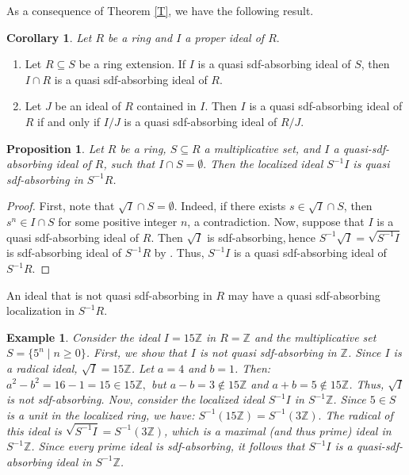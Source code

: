 \documentclass{amsart}%
\newtheorem{example}{Example}[section]
\newtheorem{corollary}{Corollary}[section]
\newtheorem{proposition}{Proposition}[section]
\begin{document}
As a consequence of Theorem \ref{T}, we have the following result.

\begin{corollary}
Let $R$ be a ring and $I$ a proper ideal of $R.$
\end{corollary}

\begin{enumerate}
\item Let $R\subseteq S$ be a ring extension. If $I$ is a quasi sdf-absorbing
ideal of $S$, then $I\cap R$ is a quasi sdf-absorbing ideal of $R$.

\item Let $J$ be an ideal of $R$ contained in $I.$ Then $I$ is a quasi
sdf-absorbing ideal of $R$ if and only if $I/J$ is a quasi sdf-absorbing ideal
of $R/J$.
\end{enumerate}

\begin{proposition}
Let $R$ be a ring, $S\subseteq R$ a multiplicative set, and $I$ a
quasi-sdf-absorbing ideal of $R$, such that $I\cap S=\emptyset.$ Then the
localized ideal $S^{-1}I$ is quasi sdf-absorbing in $S^{-1}R$.
\end{proposition}

\begin{proof}
First, note that $\sqrt{I}\cap S=\emptyset$. Indeed, if there exists
$s\in\sqrt{I}\cap S$, then $s^{n}\in I\cap S$ for some positive integer $n$, a
contradiction. Now, suppose that $I$ is a quasi sdf-absorbing ideal of $R.$
Then $\sqrt{I}$ is sdf-absorbing,$\ $hence $S^{-1}\sqrt{I}=\sqrt{S^{-1}I}$ is
sdf-absorbing ideal of $S^{-1}R$ by \cite[Theorem 2.9]{AB2024}. Thus,
$S^{-1}I$ is a quasi sdf-absorbing ideal of $S^{-1}R$.
\end{proof}

An ideal that is not quasi sdf-absorbing in $R$ may have a quasi sdf-absorbing
localization in $S^{-1}R$.

\begin{example}
Consider the ideal $I=15\mathbb{Z}$ in $R=\mathbb{Z}$ and the multiplicative
set $S=\{5^{n}\mid n\geq0\}$. First, we show that $I$ is not quasi
sdf-absorbing in $\mathbb{Z}$. Since $I$ is a radical ideal, $\sqrt
{I}=15\mathbb{Z}$. Let $a=4$ and $b=1$. Then: $a^{2}-b^{2}=16-1=15\in
15\mathbb{Z},$ but $a-b=3\notin15\mathbb{Z}$ and $a+b=5\notin15\mathbb{Z}$.
Thus, $\sqrt{I}$ is not sdf-absorbing. Now, consider the localized ideal
$S^{-1}I$ in $S^{-1}\mathbb{Z}$. Since $5\in S$ is a unit in the localized
ring, we have: $S^{-1}(15\mathbb{Z})=S^{-1}(3\mathbb{Z}).$ The radical of this
ideal is $\sqrt{S^{-1}I}=S^{-1}(3\mathbb{Z})$, which is a maximal (and thus
prime) ideal in $S^{-1}\mathbb{Z}$. Since every prime ideal is sdf-absorbing,
it follows that $S^{-1}I$ is a quasi-sdf-absorbing ideal in $S^{-1}\mathbb{Z}$.
\end{example}
\end{document}
